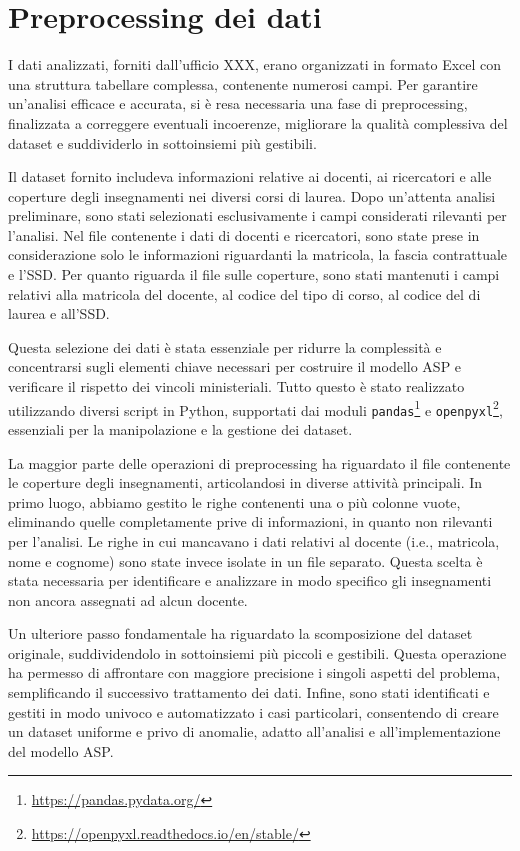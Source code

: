 \section{Preprocessing dei dati}
\label{sec:pre-proc}

I dati analizzati, forniti dall'ufficio XXX, 
erano organizzati in formato Excel con una struttura tabellare complessa, contenente 
numerosi campi. Per garantire un'analisi efficace e accurata, si è resa necessaria una 
fase di preprocessing, finalizzata a correggere eventuali incoerenze, migliorare la 
qualità complessiva del dataset e suddividerlo in sottoinsiemi più gestibili.

Il dataset fornito includeva informazioni relative ai docenti, ai ricercatori e alle 
coperture degli insegnamenti nei diversi corsi di laurea. Dopo un'attenta analisi 
preliminare, sono stati selezionati esclusivamente i campi considerati rilevanti per 
l'analisi. Nel file contenente i dati di docenti e ricercatori, sono state prese in 
considerazione solo le informazioni riguardanti la matricola, la fascia contrattuale 
e l'SSD. Per quanto riguarda il file sulle coperture, sono stati mantenuti i campi 
relativi alla matricola del docente, al codice del tipo di corso, al codice del 
di laurea e all'SSD.

Questa selezione dei dati è stata essenziale per ridurre la complessità e concentrarsi 
sugli elementi chiave necessari per costruire il modello ASP e verificare il rispetto 
dei vincoli ministeriali. Tutto questo è stato realizzato utilizzando diversi script in 
Python, supportati dai moduli \texttt{pandas}\footnote{\url{https://pandas.pydata.org/}} 
e \texttt{openpyxl}\footnote{\url{https://openpyxl.readthedocs.io/en/stable/}}, 
essenziali per la manipolazione e la gestione dei dataset.

La maggior parte delle operazioni di preprocessing ha riguardato il file contenente 
le coperture degli insegnamenti, articolandosi in diverse attività principali. 
In primo luogo, abbiamo gestito le righe contenenti una o più colonne vuote, 
eliminando quelle completamente prive di informazioni, in quanto non rilevanti 
per l'analisi. Le righe in cui mancavano i dati relativi al docente (i.e., matricola, 
nome e cognome) sono state invece isolate in un file separato. Questa scelta è stata 
necessaria per identificare e analizzare in modo specifico gli insegnamenti non 
ancora assegnati ad alcun docente.

Un ulteriore passo fondamentale ha riguardato la scomposizione del dataset originale, 
suddividendolo in sottoinsiemi più piccoli e gestibili. Questa operazione ha permesso 
di affrontare con maggiore precisione i singoli aspetti del problema, semplificando il 
successivo trattamento dei dati. Infine, sono stati identificati e gestiti in modo 
univoco e automatizzato i casi particolari, consentendo di creare un dataset uniforme 
e privo di anomalie, adatto all'analisi e all'implementazione del modello ASP.

